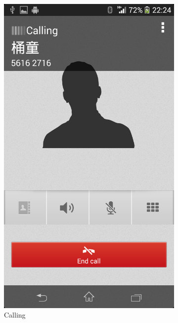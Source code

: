 \begin{figure}
\begin{subfigure}{.24\textwidth}
  \includegraphics[width=.8\linewidth]{img/screenshot/ss6.png}
  \caption{Calling}
\end{subfigure}
\begin{subfigure}{.24\textwidth}
  \centering

\end{subfigure}
\end{figure}
